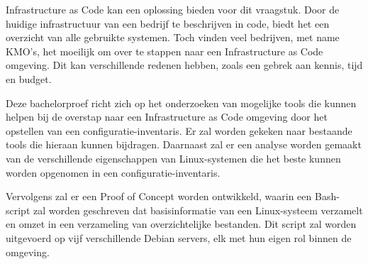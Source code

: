 Infrastructure as Code kan een oplossing bieden voor dit vraagstuk.
Door de huidige infrastructuur van een bedrijf te beschrijven in code, biedt het een overzicht van alle gebruikte systemen.
Toch vinden veel bedrijven, met name KMO's, het moeilijk om over te stappen naar een Infrastructure as Code omgeving.
Dit kan verschillende redenen hebben, zoals een gebrek aan kennis, tijd en budget.

Deze bachelorproef richt zich op het onderzoeken van mogelijke tools die kunnen helpen bij de overstap naar een Infrastructure as Code omgeving door het opstellen van een configuratie-inventaris.
Er zal worden gekeken naar bestaande tools die hieraan kunnen bijdragen.
Daarnaast zal er een analyse worden gemaakt van de verschillende eigenschappen van Linux-systemen die het beste kunnen worden opgenomen in een configuratie-inventaris.

Vervolgens zal er een Proof of Concept worden ontwikkeld, waarin een Bash-script zal worden geschreven dat basisinformatie van een Linux-systeem verzamelt en omzet in een verzameling van overzichtelijke bestanden.
Dit script zal worden uitgevoerd op vijf verschillende Debian servers, elk met hun eigen rol binnen de omgeving.
